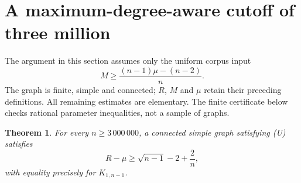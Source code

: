 \documentclass[11pt,a4paper]{article}
\newtheorem{theorem}{Theorem}[section]
\theoremstyle{remark}
\numberwithin{equation}{section}
\begin{document}
\section{A maximum-degree-aware cutoff of three million}
\label{sec:ch-three-million}

The argument in this section assumes only the uniform corpus input
\[
 M\ge\frac{(n-1)\mu-(n-2)}n.\tag{U}
\]
The graph is finite, simple and connected; $R$, $M$ and $\mu$ retain their
preceding definitions. All remaining estimates are elementary. The finite
certificate below checks rational parameter inequalities, not a sample of
graphs.



\begin{theorem}\label{thm:ch-three-million}
For every $n\ge3\,000\,000$, a connected simple graph satisfying
\textup{(U)} satisfies
\[
 R-\mu\ge\sqrt{n-1}-2+\frac2n,
\]
with equality precisely for $K_{1,n-1}$.
\end{theorem}
\end{document}
